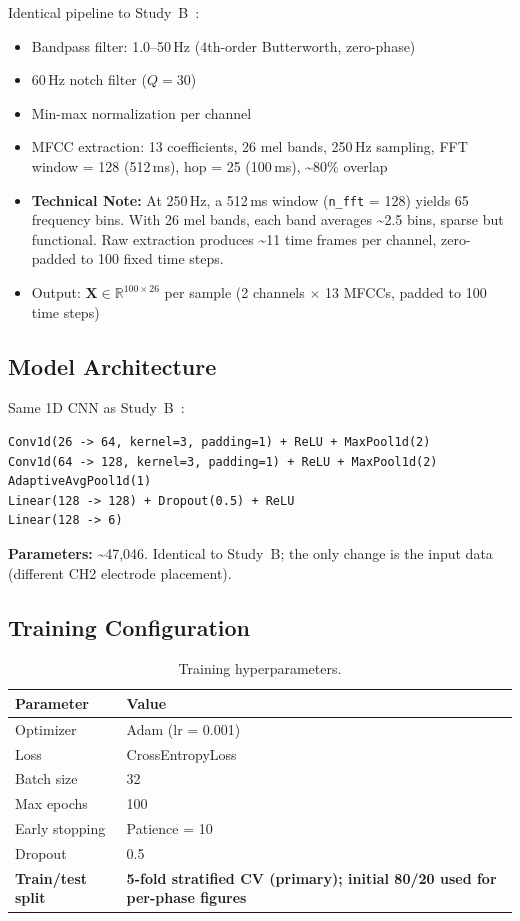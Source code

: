 \documentclass{article}
\begin{document}
Identical pipeline to Study~B~\cite[{\S}3]{kho2026companion}:
\begin{itemize}
    \item Bandpass filter: 1.0--50\,Hz (4th-order Butterworth, zero-phase)
    \item 60\,Hz notch filter ($Q = 30$)
    \item Min-max normalization per channel
    \item MFCC extraction: 13 coefficients, 26 mel bands, 250\,Hz sampling, FFT window = 128 (512\,ms), hop = 25 (100\,ms), \textasciitilde80\% overlap
    \item \textbf{Technical Note:} At 250\,Hz, a 512\,ms window (\texttt{n\_fft} = 128) yields 65 frequency bins. With 26 mel bands, each band averages \textasciitilde2.5 bins, sparse but functional. Raw extraction produces \textasciitilde11 time frames per channel, zero-padded to 100 fixed time steps.
    \item Output: $\mathbf{X} \in \mathbb{R}^{100 \times 26}$ per sample (2 channels $\times$ 13 MFCCs, padded to 100 time steps)
\end{itemize}

\subsection{Model Architecture}

Same 1D CNN as Study~B~\cite[{\S}5.1]{kho2026companion}:

\begin{verbatim}
Conv1d(26 -> 64, kernel=3, padding=1) + ReLU + MaxPool1d(2)
Conv1d(64 -> 128, kernel=3, padding=1) + ReLU + MaxPool1d(2)
AdaptiveAvgPool1d(1)
Linear(128 -> 128) + Dropout(0.5) + ReLU
Linear(128 -> 6)
\end{verbatim}

\textbf{Parameters:} \textasciitilde47{,}046. Identical to Study~B; the only change is the input data (different CH2 electrode placement).

\subsection{Training Configuration}

\begin{table}[ht]
\centering
\caption{Training hyperparameters.}
\label{tab:training}
\begin{tabular}{@{}ll@{}}
\toprule
Parameter & Value \\
\midrule
Optimizer & Adam (lr = 0.001) \\
Loss & CrossEntropyLoss \\
Batch size & 32 \\
Max epochs & 100 \\
Early stopping & Patience = 10 \\
Dropout & 0.5 \\
\textbf{Train/test split} & \textbf{5-fold stratified CV (primary); initial 80/20 used for per-phase figures} \\
\bottomrule
\end{tabular}
\end{table}
\end{document}
